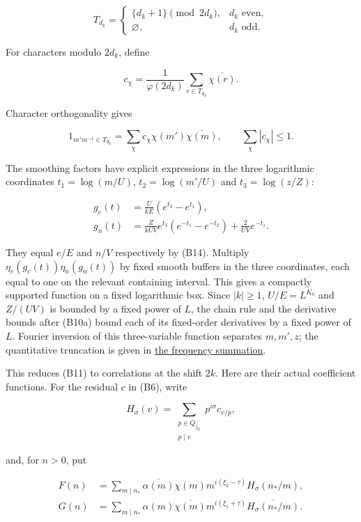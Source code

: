 \[
T_{d_k}=
\begin{cases}\{d_k+1\}\pmod{2d_k},&d_k\text{ even},\\
\varnothing,&d_k\text{ odd}.
\end{cases}
\]

For characters modulo \(2d_k\), define

\[
c_\chi=\frac1{\varphi(2d_k)}\sum_{r\in T_{d_k}}\overline{\chi(r)}.
\]

Character orthogonality gives

\[
1_{m'm^{-1}\in T_{d_k}}
 =\sum_\chi c_\chi\chi(m')\overline{\chi(m)},
\qquad\sum_\chi|c_\chi|\le1. \tag{B15}
\]

The smoothing factors have explicit expressions in the three logarithmic
coordinates \(t_1=\log(m/U)\), \(t_2=\log(m'/U)\) and \(t_3=\log(z/Z)\):

\[
\begin{aligned}
g_e(t)&=\frac{U}{kE}(e^{t_2}-e^{t_1}),\\
g_n(t)&=\frac{Z}{kUV}e^{t_3}(e^{-t_1}-e^{-t_2})
           +\frac{2}{UV}e^{-t_1}.
\end{aligned} \tag{B15a}
\]

They equal \(e/E\) and \(n/V\) respectively by (B14). Multiply
\(\eta_e(g_e(t))\eta_n(g_n(t))\) by fixed smooth buffers in the three
coordinates, each equal to one on the relevant containing interval. This
gives a compactly supported function on a fixed logarithmic box. Since
\(|k|\ge1\), \(U/E=L^{K_0}\) and \(Z/(UV)\) is bounded by a fixed power
of \(L\), the chain rule and the derivative bounds after (B10a) bound
each of its fixed-order derivatives by a fixed power of \(L\). Fourier
inversion of this three-variable function separates \(m,m',z\); the
quantitative truncation is given in
\protect\hyperlink{bilinear-summing-frequencies-and-returning-to-the-bilinear-sum}{the
frequency summation}.

This reduces (B11) to correlations at the shift \(2k\). Here are their
actual coefficient functions. For the residual \(c\) in (B6), write

\[
H_\sigma(v)=\sum_{\substack{p\in Q_{j_Q}\\p\mid v}}p^{i\sigma}c_{v/p},
\]

and, for \(n>0\), put

\[
\begin{aligned}
F(n)&=\sum_{m\mid n_*}\overline{\alpha(m)}\chi(m)
       m^{i(\xi_2-\tau)}H_\sigma(n_*/m),\\
G(n)&=\sum_{m\mid n_*}\alpha(m)\overline{\chi(m)}
       m^{i(\xi_1+\tau)}\overline{H_\sigma(n_*/m)}.
\end{aligned} \tag{B16}
\]

